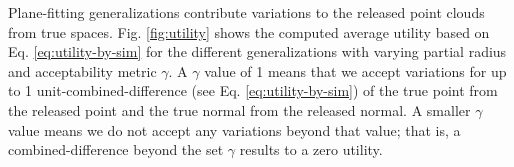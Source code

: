 Plane-fitting generalizations contribute variations to the released point clouds from true spaces. Fig. \ref{fig:utility} shows the computed average utility based on Eq. \ref{eq:utility-by-sim} for the different generalizations with varying partial radius and acceptability metric $\gamma$. A $\gamma$ value of 1 means that we accept variations for up to 1 unit-combined-difference (see Eq. \ref{eq:utility-by-sim}) of the true point from the released point and the true normal from the released normal. A smaller $\gamma$ value means we do not accept any variations beyond that value; that is, a combined-difference beyond the set $\gamma$ results to a zero utility.

